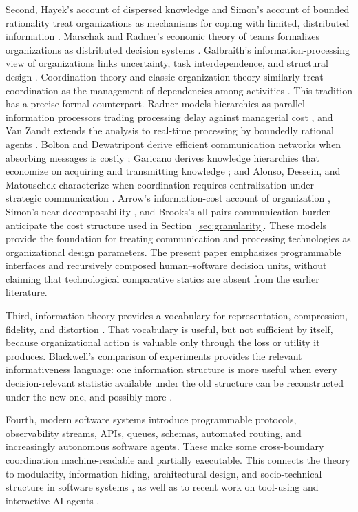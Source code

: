 \documentclass[11pt]{article}
\begin{document}
Second, Hayek's account of dispersed knowledge and Simon's account of bounded
rationality treat organizations as mechanisms for coping with limited,
distributed information \cite{hayek1945,simon1947,marchsimon1958,
cyertmarch1963}. Marschak and Radner's economic theory of teams formalizes
organizations as distributed decision systems \cite{marschakradner1972}.
Galbraith's information-processing view of organizations links uncertainty,
task interdependence, and structural design \cite{galbraith1973}. Coordination
theory and classic organization theory similarly treat coordination as the
management of dependencies among activities \cite{thompson1967,
malonecrowston1994}. This tradition has a precise formal counterpart. Radner
models hierarchies as parallel information processors trading processing delay
against managerial cost \cite{radner1993}, and Van Zandt extends the analysis
to real-time processing by boundedly rational agents \cite{vanzandt1999}.
Bolton and Dewatripont derive efficient communication networks when absorbing
messages is costly \cite{boltondewatripont1994}; Garicano derives knowledge
hierarchies that economize on acquiring and transmitting knowledge
\cite{garicano2000}; and Alonso, Dessein, and Matouschek characterize when
coordination requires centralization under strategic communication
\cite{alonso2008}. Arrow's information-cost account of organization
\cite{arrow1974}, Simon's near-decomposability \cite{simon1962}, and Brooks's
all-pairs communication burden \cite{brooks1975} anticipate the cost structure
used in Section~\ref{sec:granularity}. These models provide the foundation for treating communication and
processing technologies as organizational design parameters. The present
paper emphasizes programmable interfaces and recursively composed
human--software decision units, without claiming that technological
comparative statics are absent from the earlier literature.

Third, information theory provides a vocabulary for representation,
compression, fidelity, and distortion \cite{shannon1948}. That vocabulary is
useful, but not sufficient by itself, because organizational action is valuable
only through the loss or utility it produces. Blackwell's comparison of
experiments provides the relevant informativeness language: one information
structure is more useful when every decision-relevant statistic available under
the old structure can be reconstructed under the new one, and possibly more
\cite{blackwell1953}.

Fourth, modern software systems introduce programmable protocols, observability
streams, APIs, queues, schemas, automated routing, and increasingly autonomous
software agents. These make some cross-boundary coordination machine-readable
and partially executable. This connects the theory to modularity, information
hiding, architectural design, and socio-technical structure in software
systems \cite{conway1968,parnas1972,hendersonclark1990,baldwinclark2000}, as
well as to recent work on tool-using and interactive AI agents
\cite{amershi2019,yao2023,schick2023,wu2023autogen,yang2024sweagent,park2023}.
\end{document}
